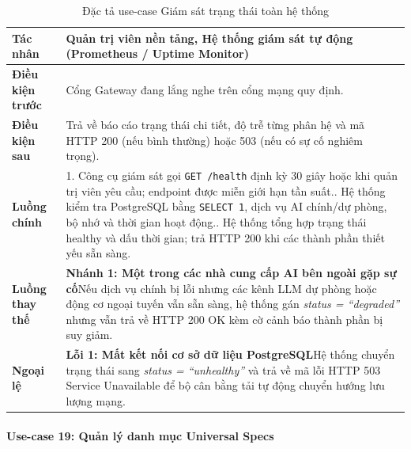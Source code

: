 \begingroup
\small
\begin{longtable}{|p{3.2cm}|p{\dimexpr\linewidth-3.2cm-4\tabcolsep-3\arrayrulewidth\relax}|}
\caption{Đặc tả use-case Giám sát trạng thái toàn hệ thống}
\label{aihub:tab:uc_health_probe}\\
\hline
\textbf{Tác nhân} & Quản trị viên nền tảng, Hệ thống giám sát tự động (Prometheus / Uptime Monitor) \\ \hline
\textbf{Điều kiện trước} & Cổng Gateway đang lắng nghe trên cổng mạng quy định. \\ \hline
\textbf{Điều kiện sau} & Trả về báo cáo trạng thái chi tiết, độ trễ từng phân hệ và mã HTTP 200 (nếu bình thường) hoặc 503 (nếu có sự cố nghiêm trọng). \\ \hline
\textbf{Luồng chính} & 1. Công cụ giám sát gọi \texttt{GET /health} định kỳ 30 giây hoặc khi quản trị viên yêu cầu; endpoint được miễn giới hạn tần suất.\newline 2. Hệ thống kiểm tra PostgreSQL bằng \texttt{SELECT 1}, dịch vụ AI chính/dự phòng, bộ nhớ và thời gian hoạt động.\newline 3. Hệ thống tổng hợp trạng thái healthy và dấu thời gian; trả HTTP 200 khi các thành phần thiết yếu sẵn sàng. \\ \hline
\textbf{Luồng thay thế} &
\textbf{Nhánh 1: Một trong các nhà cung cấp AI bên ngoài gặp sự cố}\newline Nếu dịch vụ chính bị lỗi nhưng các kênh LLM dự phòng hoặc động cơ ngoại tuyến vẫn sẵn sàng, hệ thống gán \textit{status = ``degraded''} nhưng vẫn trả về HTTP 200 OK kèm cờ cảnh báo thành phần bị suy giảm. \\ \hline
\textbf{Ngoại lệ} &
\textbf{Lỗi 1: Mất kết nối cơ sở dữ liệu PostgreSQL}\newline Hệ thống chuyển trạng thái sang \textit{status = ``unhealthy''} và trả về mã lỗi HTTP 503 Service Unavailable để bộ cân bằng tải tự động chuyển hướng lưu lượng mạng. \\ \hline
\end{longtable}
\endgroup

\paragraph{Use-case 19: Quản lý danh mục Universal Specs}

